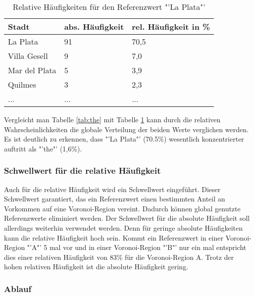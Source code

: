 				\begin{table}[h]
				\centering
				\caption{Relative Häufigkeiten für den Referenzwert "'La Plata"'}
				\label{tab:laPlata}
				\begin{tabular}{|l|l|l|}
				\hline
				Stadt            & abs. Häufigkeit & rel. Häufigkeit in \% \\ \hline \hline
				La Plata         & 91              & 70,5                      \\ \hline
				Villa Gesell     & 9               & 7,0                       \\ \hline
				Mar del Plata    & 5               & 3,9                       \\ \hline
				Quilmes          & 3               & 2,3                       \\ \hline
				... & ... & ... \\ \hline
				\end{tabular}
				\end{table}

				Vergleicht man Tabelle \ref{tab:the} mit Tabelle \ref{tab:laPlata} kann durch die relativen Wahrscheinlichkeiten die globale Verteilung der beiden Werte verglichen werden.
				Es ist deutlich zu erkennen, dass "'La Plata"' (70.5\%) wesentlich konzentrierter auftritt als "'the"' (1,6\%).

			\subsubsection{Schwellwert für die relative Häufigkeit}

				Auch für die relative Häufigkeit wird ein Schwellwert eingeführt. 
				Dieser Schwellwert garantiert, das ein Referenzwert einen bestimmten Anteil an Vorkommen auf eine Voronoi-Region vereint.
				Dadurch können global genutzte Referenzwerte eliminiert werden.
				Der Schwellwert für die absolute Häufigkeit soll allerdings weiterhin verwendet werden. 
				Denn für geringe absolute Häufigkeiten kann die relative Häufigkeit hoch sein.
				Kommt ein Referenzwert in einer Voronoi-Region "'A"' 5 mal vor und in einer Voronoi-Region "'B"' nur ein mal entspricht dies einer relativen Häufigkeit von 83\% für die Voronoi-Region A.
				Trotz der hohen relativen Häufigkeit ist die absolute Häufigkeit gering.    
			
			\subsubsection{Ablauf}

